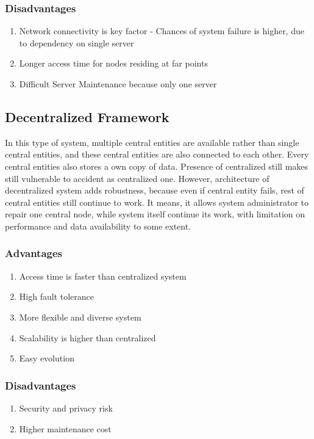 \documentclass[a4paper,twoside,12pt]{report}
\begin{document}
\begin{spacing}{1.5}
\subsubsection{Disadvantages}
	\begin{enumerate}
	\item{Network connectivity is key factor - Chances of system failure is higher, due to dependency on single server}
	\item{Longer access time for nodes residing at far points}
	\item{Difficult Server Maintenance because only one server}
\end{enumerate}	 
\subsection{Decentralized Framework}
In this type of system, multiple central entities are available rather than single central entities, and these central entities are also connected to each other. Every central entities also stores a own copy of data. Presence of centralized still makes still vulnerable to accident as centralized one. However, architecture of decentralized system adds robustness, because even if central entity fails, rest of central entities still continue to work. It means, it allows system administrator to repair one central node, while system itself continue its work, with limitation on performance and data availability to some extent.   
\subsubsection{Advantages}
\begin{enumerate}
	\item{Access time is faster than centralized system}
	\item{High fault tolerance}
	\item{More flexible and diverse system}
	\item{Scalability is higher than centralized}
	\item{Easy evolution}
\end{enumerate}
\subsubsection{Disadvantages}
\begin{enumerate}
	\item{Security and privacy risk}
	\item{Higher maintenance cost}
\end{enumerate}

\end{spacing}
\end{document}
